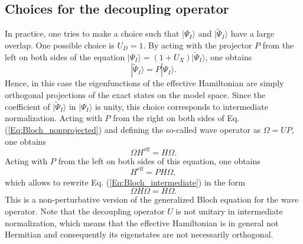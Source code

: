 \subsection{Choices for the decoupling operator}
In practice, one tries to make a choice such that $|\Psi_I\rangle$ and $|\tilde{\Psi}_I\rangle$ have a large overlap.
One possible choice is ${U_D} = 1$. By acting with the projector $P$ from the left on both sides of the equation $|{\Psi _I}\rangle  = (1 + {U_X})|{\tilde \Psi _I}\rangle $, one obtains
	\begin{equation}
	|{\tilde \Psi _I}\rangle  = P|{\Psi _I}\rangle. 
	\end{equation} 	
Hence, in this case the eigenfunctions of the effective Hamiltonian are simply orthogonal projections of the exact states on the model space. Since the coefficient of $|{\tilde \Psi _I}\rangle $ in $|{\Psi _I}\rangle $ is unity, this choice corresponds to intermediate normalization. Acting with $P$ from the right on both sides of Eq. (\ref{Eq:Bloch_nonprojected}) and defining the so-called wave operator as $\Omega  = UP$, one obtains
	\begin{equation}
	\label{Eq:Bloch_intermediate}
	\Omega {H^{{\text{eff}}}} = H\Omega. 
	\end{equation} 	
Acting with $P$ from the left on both sides of this equation, one obtains
	\begin{equation}
	\label{Eq:Heff_IN_exact}
	{H^{{\text{eff}}}} = PH\Omega, 
	\end{equation} 	
which allows to rewrite Eq. (\ref{Eq:Bloch_intermediate}) in the form
	\begin{equation}
	\Omega H\Omega  = H\Omega. 
	\end{equation} 
This is a non-perturbative version\cite{Duran_1983_3184} of the generalized Bloch equation for the wave operator.\cite{Lindg_1974_2441} Note that the decoupling operator $U$ is not unitary in intermediate normalization, which means that the effective Hamiltonian is in general not Hermitian and consequently its eigenstates are not necessarily orthogonal.

